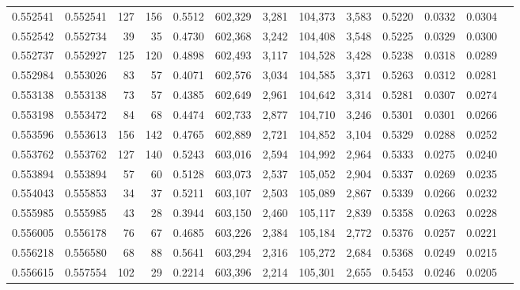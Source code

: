 \begin{tabular}{rrrrrrrrrrrrr}
0.552541 & 0.552541 &   127 &   156 &                                     0.5512 & 602,329 &   3,281 & 104,373 &   3,583 & 0.5220 & 0.0332 & 0.0304 \\
0.552542 & 0.552734 &    39 &    35 &                                     0.4730 & 602,368 &   3,242 & 104,408 &   3,548 & 0.5225 & 0.0329 & 0.0300 \\
0.552737 & 0.552927 &   125 &   120 &                                     0.4898 & 602,493 &   3,117 & 104,528 &   3,428 & 0.5238 & 0.0318 & 0.0289 \\
0.552984 & 0.553026 &    83 &    57 &                                     0.4071 & 602,576 &   3,034 & 104,585 &   3,371 & 0.5263 & 0.0312 & 0.0281 \\
0.553138 & 0.553138 &    73 &    57 &                                     0.4385 & 602,649 &   2,961 & 104,642 &   3,314 & 0.5281 & 0.0307 & 0.0274 \\
0.553198 & 0.553472 &    84 &    68 &                                     0.4474 & 602,733 &   2,877 & 104,710 &   3,246 & 0.5301 & 0.0301 & 0.0266 \\
0.553596 & 0.553613 &   156 &   142 &                                     0.4765 & 602,889 &   2,721 & 104,852 &   3,104 & 0.5329 & 0.0288 & 0.0252 \\
0.553762 & 0.553762 &   127 &   140 &                                     0.5243 & 603,016 &   2,594 & 104,992 &   2,964 & 0.5333 & 0.0275 & 0.0240 \\
0.553894 & 0.553894 &    57 &    60 &                                     0.5128 & 603,073 &   2,537 & 105,052 &   2,904 & 0.5337 & 0.0269 & 0.0235 \\
0.554043 & 0.555853 &    34 &    37 &                                     0.5211 & 603,107 &   2,503 & 105,089 &   2,867 & 0.5339 & 0.0266 & 0.0232 \\
0.555985 & 0.555985 &    43 &    28 &                                     0.3944 & 603,150 &   2,460 & 105,117 &   2,839 & 0.5358 & 0.0263 & 0.0228 \\
0.556005 & 0.556178 &    76 &    67 &                                     0.4685 & 603,226 &   2,384 & 105,184 &   2,772 & 0.5376 & 0.0257 & 0.0221 \\
0.556218 & 0.556580 &    68 &    88 &                                     0.5641 & 603,294 &   2,316 & 105,272 &   2,684 & 0.5368 & 0.0249 & 0.0215 \\
0.556615 & 0.557554 &   102 &    29 &                                     0.2214 & 603,396 &   2,214 & 105,301 &   2,655 & 0.5453 & 0.0246 & 0.0205 \\

\end{tabular}
